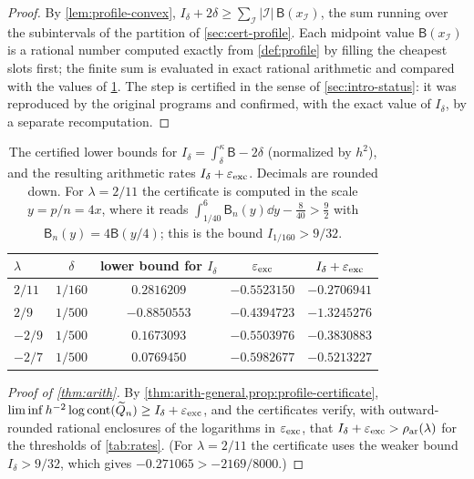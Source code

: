 \begin{proof}
By \cref{lem:profile-convex}, $I_\delta+2\delta\ge\sum_{\mathcal I}|\mathcal I|\,\mathsf B(x_{\mathcal I})$, the sum running over the subintervals of the partition of \cref{sec:cert-profile}. Each midpoint value $\mathsf B(x_{\mathcal I})$ is a rational number computed exactly from \cref{def:profile} by filling the cheapest slots first; the finite sum is evaluated in exact rational arithmetic and compared with the values of \cref{tab:profile}. The step is certified in the sense of \cref{sec:intro-status}: it was reproduced by the original programs and confirmed, with the exact value of $I_\delta$, by a separate recomputation.
\end{proof}

\begin{table}[ht]
\centering
\caption{The certified lower bounds for $I_\delta=\int_\delta^\kappa\mathsf B-2\delta$ (normalized by $h^2$), and the resulting arithmetic rates $I_\delta+\varepsilon_{\mathrm{exc}}$. Decimals are rounded down. For $\lambda=2/11$ the certificate is computed in the scale $y=p/n=4x$, where it reads $\int_{1/40}^6\mathsf B_n(y)\dd y-\frac8{40}>\frac92$ with $\mathsf B_n(y)=4\mathsf B(y/4)$; this is the bound $I_{1/160}>9/32$.}
\label{tab:profile}
\begin{tabular}{@{}lcccc@{}}
\toprule
$\lambda$ & $\delta$ & lower bound for $I_\delta$ & $\varepsilon_{\mathrm{exc}}$ & $I_\delta+\varepsilon_{\mathrm{exc}}$\\
\midrule
$2/11$ & $1/160$ & $0.2816209$ & $-0.5523150$ & $-0.2706941$\\
$2/9$ & $1/500$ & $-0.8850553$ & $-0.4394723$ & $-1.3245276$\\
$-2/9$ & $1/500$ & $0.1673093$ & $-0.5503976$ & $-0.3830883$\\
$-2/7$ & $1/500$ & $0.0769450$ & $-0.5982677$ & $-0.5213227$\\
\bottomrule
\end{tabular}
\end{table}

\begin{proof}[Proof of \cref{thm:arith}]
By \cref{thm:arith-general,prop:profile-certificate}, $\liminf h^{-2}\log\operatorname{cont}(\widetilde{Q}_n)\ge I_\delta+\varepsilon_{\mathrm{exc}}$, and the certificates verify, with outward-rounded rational enclosures of the logarithms in $\varepsilon_{\mathrm{exc}}$, that $I_\delta+\varepsilon_{\mathrm{exc}}>\rho_{\mathrm{ar}}(\lambda)$ for the thresholds of \cref{tab:rates}. (For $\lambda=2/11$ the certificate uses the weaker bound $I_\delta>9/32$, which gives $-0.271065>-2169/8000$.)
\end{proof}

